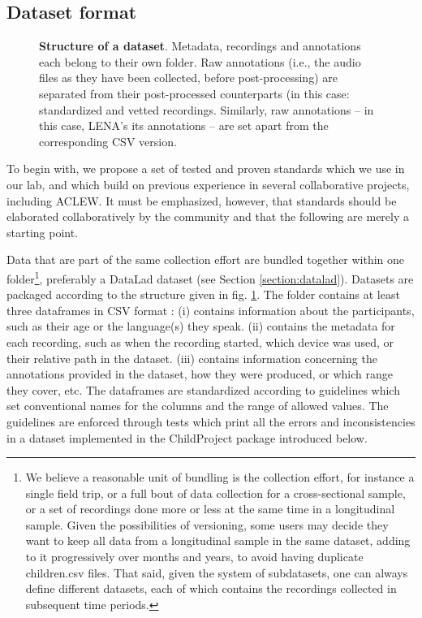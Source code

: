 \documentclass[smallextended]{svjour3}       %
\newcommand{\inputTikZ}[2]{%
     \scalebox{#1}{}
}
\begin{document}
\subsection{\label{sec:format}Dataset format}

\begin{figure}[ht]
    \centering
    \inputTikZ{0.8}{Fig2.tex}
    \caption{\textbf{Structure of a dataset}. Metadata, recordings and annotations each belong to their own folder. Raw annotations (i.e., the audio files as they have been collected, before post-processing) are separated from their post-processed counterparts (in this case: standardized and vetted recordings. Similarly, raw annotations -- in this case, LENA's its annotations -- are set apart from the corresponding CSV version.}
    \label{fig:tree}
\end{figure}

To begin with, we propose a set of tested and proven standards which we use in our lab, and which build on previous experience in several collaborative projects, including ACLEW. It must be emphasized, however, that standards should be elaborated collaboratively by the community and that the following are merely a starting point.

Data that are part of the same collection effort are bundled together within one folder\footnote{We believe a reasonable unit of bundling is the collection effort, for instance a single field trip, or a full bout of data collection for a cross-sectional sample, or a set of recordings done more or less at the same time in a longitudinal sample. Given the possibilities of versioning, some users may decide they want to keep all data from a longitudinal sample in the same dataset, adding to it progressively over months and years, to avoid having duplicate children.csv files. That said, given the system of subdatasets, one can always define different datasets, each of which contains the recordings collected in subsequent time periods.}, preferably a DataLad dataset (see Section \ref{section:datalad}). Datasets are packaged according to the structure given in fig. \ref{fig:tree}. The  folder contains at least three dataframes in CSV format : (i)  contains information about the participants, such as their age or the language(s) they speak. (ii)  contains the metadata for each recording, such as when the recording started, which device was used, or their relative path in the dataset. (iii)  contains information concerning the annotations provided in the dataset, how they were produced, or which range they cover, etc. The dataframes are standardized according to guidelines which set conventional names for the columns and the range of allowed values. The guidelines are enforced through tests which print all the errors and inconsistencies in a dataset implemented in the ChildProject package introduced below.
\end{document}
